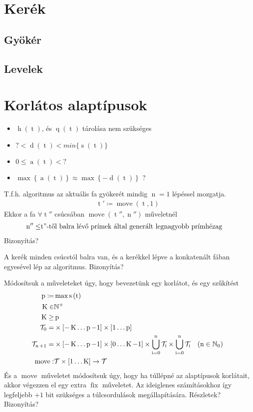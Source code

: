 \documentclass{article}
\newcommand*{\NaturalsP}{\ensuremath{\mathbb{N}^+}}
\newcommand*{\NaturalsZ}{\ensuremath{\mathbb{N}_0}}
\newcommand*{\Trees}{\ensuremath{\mathcal{T}}}
\newcommand*{\fFix}{\ensuremath{\operatorname{fix}}}
\newcommand*{\fMove}{\ensuremath{\operatorname{move}}}
\newcommand*{\sAccumulated}[1]{\ensuremath{\operatorname{a}\left(#1\right)}}
\newcommand*{\sDiff}[1]{\ensuremath{\operatorname{d}\left(#1\right)}}
\newcommand*{\sHeight}[1]{\ensuremath{\operatorname{h}\left(#1\right)}}
\newcommand*{\sPosition}[1]{\ensuremath{\operatorname{q}\left(#1\right)}}
\newcommand*{\sPrimes}[1]{\ensuremath{\operatorname{s}\left(#1\right)}}
\newcommand*{\vI}{\ensuremath{\operatorname{i}}}
\newcommand*{\vK}{\ensuremath{\operatorname{K}}}
\newcommand*{\vN}{\ensuremath{\operatorname{n}}}
\newcommand*{\vP}{\ensuremath{\operatorname{p}}}
\newcommand*{\vT}{\ensuremath{\operatorname{t}}}
\begin{document}
\section{Kerék}

\subsection{Gyökér}

\subsection{Levelek}

\section{Korlátos alaptípusok}

\begin{itemize}
\item $ \sHeight{\vT} $, és $ \sPosition{\vT} $ tárolása nem szükséges
\item $ ? < \sDiff{\vT} < min\{\sPrimes{\vT}\} $
\item $ 0 \le \sAccumulated{\vT} < ? $
\item $ \max \left\lbrace \sAccumulated{\vT} \right\rbrace
	\approx \max \left\lbrace -\sDiff{\vT} \right\rbrace $ ?
\end{itemize}

T.f.h. algoritmus az aktuális fa gyökerét mindig $\vN = 1$ lépéssel mozgatja.
\begin{align*}
\vT' \coloneqq \fMove(\vT, 1)
\end{align*}
Ekkor a fa $ \forall \vT'' $ csúcsában $ \fMove(\vT'', \vN'') $ műveletnél
\begin{align*}
\vN'' \le& \textrm{\vT''-től balra lévő prímek által generált legnagyobb prímhézag}
\end{align*}
{ \color{red} Bizonyítás? }

A kerék minden csúcstól balra van, és a kerékkel lépve a konkatenált fában egyesével lép az algoritmus. { \color{red} Bizonyítás? }

Módosítsuk a műveleteket úgy, hogy bevezetünk egy korlátot, és egy szűkítést
\begin{align*}
\vP \coloneqq& \max \sPrimes{\vT} \\
\vK \in& \NaturalsP \\
\vK \ge& \vP \\
\Trees_0 =&
	\times \left[ -\vK \mathellipsis \vP-1 \right]
	\times \left[ 1 \mathellipsis \vP \right] \\
\Trees_{\vN+1} =&
	\times \left[ -\vK \mathellipsis \vP-1 \right]
	\times \left[ 0 \mathellipsis \vK-1 \right]
	\times \bigcup_{\vI=0}^{\vN} \Trees_{\vI}
	\times \bigcup_{\vI=0}^{\vN} \Trees_{\vI}
	& (\vN \in \NaturalsZ) \\
\fMove :& \Trees \times \left[ 1 \mathellipsis \vK \right] \rightarrow \Trees
\end{align*}
És a $ \fMove $ műveletet módosítsuk úgy, hogy ha túllépné az alaptípusok korlátait,
akkor végezzen el egy extra $ \fFix $ műveletet.
Az ideiglenes számításokhoz így legfeljebb $ +1 $ bit szükséges a túlcsordulások megállapítására.
{ \color{red} Részletek? Bizonyítás? }
\end{document}
